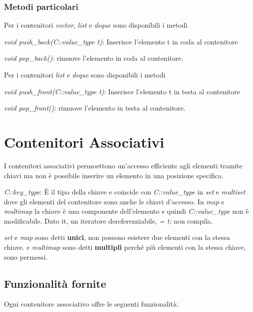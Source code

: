 \subsubsection{Metodi particolari}

Per i contenitori \textit{vector}, \textit{list} e \textit{deque} sono disponibili i metodi

\begin{description}
	\item \textit{void push\_back(C::value\_type t)}: Inserisce l'elemento t in coda al contenitore
	\item \textit{void pop\_back()}: rimuove l'elemento in coda al contenitore.
\end{description}

Per i contenitori \textit{list} e \textit{deque} sono disponibili i metodi

\begin{description}
	\item \textit{void push\_front(C::value\_type t)}: Inserisce l'elemento t in testa al contenitore
	\item \textit{void pop\_front()}: rimuove l'elemento in testa al contenitore.
\end{description}

\section{Contenitori Associativi}
I contenitori associativi permoettono un'accesso efficiente agli elementi tramite chiavi ma non è possibile inserire un elemento in una posizione specifica.

\textit{C::key\_type}: \`{E} il tipo della chiave e coincide con \textit{C::value\_type} in \textit{set} e \textit{multiset} dove gli elementi del contenitore sono anche le chiavi d'accesso. In \textit{map} e \textit{multimap} la chiave è una componente dell'elemento e quindi \textit{C::value\_type} non è modificabile. Dato it, un iteratore dereferenziabile, \textit{\textasteriskcenteredit = t;} non compila.

\textit{set} e \textit{map} sono detti \textbf{unici}, non possono esistere due elementi con la stessa chiave.
 e \textit{multimap} sono detti \textbf{multipli} perché più elementi con la stessa chiave, sono permessi.

\subsection{Funzionalità fornite}
Ogni contenitore associativo offre le seguenti funzionalità:

